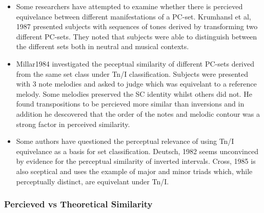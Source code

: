 \documentclass{article}
\begin{document}
\begin{itemize}
\item Some researchers have attempted to examine whether there is
  percieved equivelance between different manifestations of a
  PC-set. Krumhansl et al, 1987 presented subjects with sequences of
  tones derived by transforming two different PC-sets. They noted that
  subjects were able to distinguish between the different sets both in
  neutral and musical contexts.
\item Millar1984 investigated the peceptual similarity of different
  PC-sets derived from the same set class under Tn/I
  classification. Subjects were presented with 3 note melodies and
  asked to judge which was equivelant to a reference melody. Some
  melodies preserved the SC identity whilst others did not. He found
  transpositions to be percieved more similar than inversions and in
  addition he descovered that the order of the notes and
  melodic contour was a strong factor in perceived similarity.
\item Some authors have questioned the perceptual relevance of using Tn/I
  equivelance as a basis for set classification. Deutsch, 1982 seems
  unconvinced by evidence for the perceptual similarity of inverted
  intervals. Cross, 1985 is also sceptical and uses the example of
  major and minor triads which, while perceptually distinct, are
  equivelant under Tn/I.
\end{itemize}
\subsubsection{Percieved vs Theoretical Similarity}
\label{sec-3-5-3}
\end{document}
